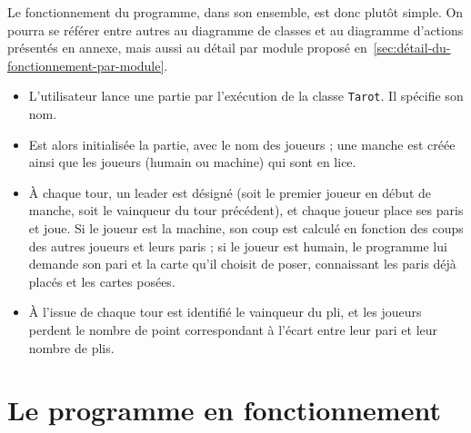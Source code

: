    Le fonctionnement du programme, dans son ensemble, est donc plutôt simple.
   On pourra se référer entre autres au diagramme de classes et au diagramme d'actions présentés en annexe, mais aussi au détail par module proposé en~\ref{sec:détail-du-fonctionnement-par-module}.
   \begin{itemize}
      \item L'utilisateur lance une partie par l'exécution de la classe \texttt{Tarot}.
      Il spécifie son nom.
      \item Est alors initialisée la partie, avec le nom des joueurs ;
      une manche est créée ainsi que les joueurs (humain ou machine) qui sont en lice.
      \item À chaque tour, un leader est désigné (soit le premier joueur en début de manche, soit le vainqueur du tour précédent), et chaque joueur place ses paris et joue.
      Si le joueur est la machine, son coup est calculé en fonction des coups des autres joueurs et leurs paris ;
      si le joueur est humain, le programme lui demande son pari et la carte qu'il choisit de poser, connaissant les paris déjà placés et les cartes posées.
      \item À l'issue de chaque tour est identifié le vainqueur du pli, et les joueurs perdent le nombre de point correspondant à l'écart entre leur pari et leur nombre de plis.
   \end{itemize}

\section{Le programme en fonctionnement}\label{sec:le-programme-en-fonctionnement}

